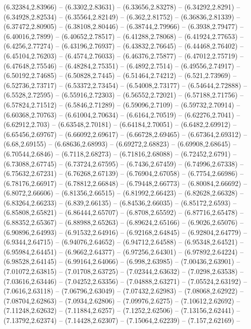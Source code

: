{(6.32384,2.83966) -- (6.3302,2.83631) -- (6.33656,2.83278) -- (6.34292,2.8291) -- (6.34928,2.82534) -- (6.35564,2.82149) -- (6.362,2.81752) -- (6.36836,2.81339) -- (6.37472,2.80905) -- (6.38108,2.80446) -- (6.38744,2.79966) -- (6.3938,2.79477) --
(6.40016,2.7899) -- (6.40652,2.78517) -- (6.41288,2.78068) -- (6.41924,2.77653) -- (6.4256,2.77274) -- (6.43196,2.76937) -- (6.43832,2.76645) -- (6.44468,2.76402) -- (6.45104,2.76203) -- (6.4574,2.76033) -- (6.46376,2.75877) -- (6.47012,2.75719) --
(6.47648,2.75546) -- (6.48284,2.75351) -- (6.4892,2.7514) -- (6.49556,2.74917) -- (6.50192,2.74685) -- (6.50828,2.7445) -- (6.51464,2.74212) -- (6.521,2.73969) -- (6.52736,2.73717) -- (6.53372,2.73454) -- (6.54008,2.73177) -- (6.54644,2.72888) --
(6.5528,2.72595) -- (6.55916,2.72303) -- (6.56552,2.72021) -- (6.57188,2.71756) -- (6.57824,2.71512) -- (6.5846,2.71289) -- (6.59096,2.7109) -- (6.59732,2.70914) -- (6.60368,2.70763) -- (6.61004,2.70634) -- (6.6164,2.70519) -- (6.62276,2.7041) --
(6.62912,2.703) -- (6.63548,2.70181) -- (6.64184,2.70051) -- (6.6482,2.69912) -- (6.65456,2.69767) -- (6.66092,2.69617) -- (6.66728,2.69465) -- (6.67364,2.69312) -- (6.68,2.69155) -- (6.68636,2.68993) -- (6.69272,2.68823) -- (6.69908,2.68645) --
(6.70544,2.6846) -- (6.7118,2.68273) -- (6.71816,2.68088) -- (6.72452,2.6791) -- (6.73088,2.67745) -- (6.73724,2.67595) -- (6.7436,2.67459) -- (6.74996,2.67338) -- (6.75632,2.67231) -- (6.76268,2.67139) -- (6.76904,2.67058) -- (6.7754,2.66986) --
(6.78176,2.66917) -- (6.78812,2.66848) -- (6.79448,2.66773) -- (6.80084,2.66692) -- (6.8072,2.66606) -- (6.81356,2.66515) -- (6.81992,2.66423) -- (6.82628,2.66328) -- (6.83264,2.66233) -- (6.839,2.66135) -- (6.84536,2.66035) -- (6.85172,2.6593) --
(6.85808,2.65821) -- (6.86444,2.65707) -- (6.8708,2.65592) -- (6.87716,2.65478) -- (6.88352,2.65367) -- (6.88988,2.65263) -- (6.89624,2.65166) -- (6.9026,2.65076) -- (6.90896,2.64993) -- (6.91532,2.64916) -- (6.92168,2.64845) -- (6.92804,2.64779) --
(6.9344,2.64715) -- (6.94076,2.64652) -- (6.94712,2.64588) -- (6.95348,2.64521) -- (6.95984,2.64451) -- (6.9662,2.64377) -- (6.97256,2.64301) -- (6.97892,2.64224) -- (6.98528,2.64145) -- (6.99164,2.64066) -- (6.998,2.63985) -- (7.00436,2.63901) --
(7.01072,2.63815) -- (7.01708,2.63725) -- (7.02344,2.63632) -- (7.0298,2.63538) -- (7.03616,2.63446) -- (7.04252,2.63356) -- (7.04888,2.63271) -- (7.05524,2.63192) -- (7.0616,2.63118) -- (7.06796,2.63049) -- (7.07432,2.62983) -- (7.08068,2.62922) --
(7.08704,2.62863) -- (7.0934,2.62806) -- (7.09976,2.6275) -- (7.10612,2.62692) -- (7.11248,2.62632) -- (7.11884,2.6257) -- (7.1252,2.62506) -- (7.13156,2.62441) -- (7.13792,2.62374) -- (7.14428,2.62307) -- (7.15064,2.62239) -- (7.157,2.62169) --
}

